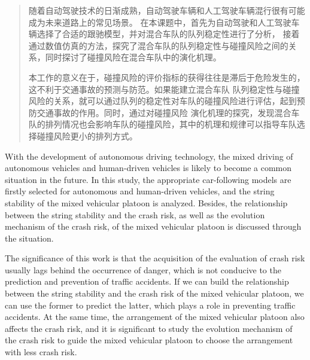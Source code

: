 

\begin{abstract}
随着自动驾驶技术的日渐成熟，自动驾驶车辆和人工驾驶车辆混行很有可能成为未来道路上的常见场景。
在本课题中，首先为自动驾驶和人工驾驶车辆选择了合适的跟驰模型，并对混合车队的队列稳定性进行了分析，
接着通过数值仿真的方法，探究了混合车队的队列稳定性与碰撞风险之间的关系，同时探讨了碰撞风险在混合车队中的演化机理。

本工作的意义在于，碰撞风险的评价指标的获得往往是滞后于危险发生的，这不利于交通事故的预测与防范。如果能建立混合车队
队列稳定性与碰撞风险的关系，就可以通过队列的稳定性对车队的碰撞风险进行评估，起到预防交通事故的作用。同时，通过对碰撞风险
演化机理的探究，发现混合车队的排列情况也会影响车队的碰撞风险，其中的机理和规律可以指导车队选择碰撞风险更小的排列方式。


\end{abstract}

\begin{abstract*}
  
With the development of autonomous driving technology, 
the mixed driving of autonomous vehicles and human-driven vehicles is likely to become a common situation in the future.
In this study, the appropriate car-following models are firstly selected for autonomous and human-driven vehicles,
and the string stability of the mixed vehicular platoon is analyzed.
Besides, the relationship between the string stability and the crash risk, 
as well as the evolution mechanism of the crash risk,  of the mixed vehicular platoon is discussed 
through the situation. 

The significance of this work is that the acquisition of the evaluation of crash risk usually lags behind the
occurrence of danger, which is not conducive to the prediction and prevention of traffic accidents.
If we can build the relationship between the string stability and the crash risk of the mixed vehicular platoon,
we can use the former to predict the latter,
which plays a role in preventing traffic accidents. 
At the same time, the arrangement of the mixed vehicular platoon also affects the crash risk,
and it is significant to study the evolution mechanism of the crash risk 
to guide the mixed vehicular platoon to choose the arrangement with less crash risk.

\end{abstract*}